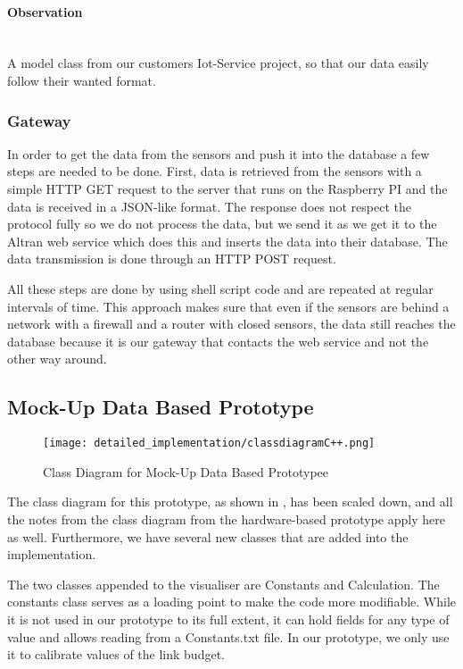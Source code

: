 \documentclass[../document]{subfiles}
\begin{document}
\paragraph{Observation} \ \\
A model class from our customers Iot-Service project, so that our data easily follow their wanted format.

\subsubsection{Gateway}
In order to get the data from the sensors and push it into the database a few steps are needed to be done. First, data is retrieved from the sensors with a simple HTTP GET request to the server that runs on the Raspberry PI and the data is received in a JSON-like format. The response does not respect the protocol fully so we do not process the data, but we send it as we get it to the Altran web service which does this and inserts the data into their database. The data transmission is done through an HTTP POST request. 

All these steps are done by using shell script code and are repeated at regular intervals of time.
This approach makes sure that even if the sensors are behind a network with a firewall and a router with closed sensors, the data still reaches the database because it is our gateway that contacts the web service and not the other way around.

\subsection{Mock-Up Data Based Prototype}

\begin{figure}[H]
\centering
\texttt{[image: detailed\_implementation/classdiagramC++.png]}
\caption{Class Diagram for Mock-Up Data Based Prototypee}
\label{fig:ClassDiagramC++}
\end{figure}

The class diagram for this prototype, as shown in , has been scaled down, and all the notes from the class diagram from the hardware-based prototype apply here as well. Furthermore, we have several new classes that are added into the implementation.

The two classes appended to the visualiser are Constants and Calculation. The constants class serves as a loading point to make the code more modifiable. While it is not used in our prototype to its full extent, it can hold fields for any type of value and allows reading from a Constants.txt file. In our prototype, we only use it to calibrate values of the link budget. 
\end{document}
